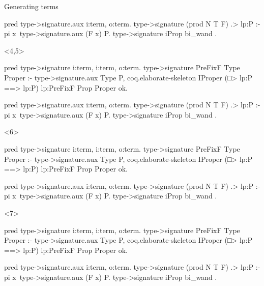 \documentclass[aspectratio=169]{beamer}
\begin{document}
\begin{frame}[fragile]{Generating terms}
\begin{onlyenv}
\begin{elpicode}[highlightlines={3},highlightcolor=DarkSalmon]
            pred type->signature.aux i:term, o:term.
            type->signature (prod N T F) {{ .> lp:P }} :-
                pi x\ type->signature.aux (F x) P.
            type->signature {{ iProp }} {{ bi_wand }}.
        \end{elpicode}
    \end{onlyenv}
    \begin{onlyenv}<4,5>
        \begin{elpicode}[highlightlines={9,10},highlightcolor=DarkSalmon]
            pred type->signature i:term, i:term, o:term.
            type->signature PreFixF Type Proper :-
                type->signature.aux Type P,
                coq.elaborate-skeleton 
                    {{ IProper (□> lp:P ==> lp:P) lp:PreFixF }} 
                    {{ Prop }} Proper ok.
    
            pred type->signature.aux i:term, o:term.
            type->signature (prod N T F) {{ .> lp:P }} :-
                pi x\ type->signature.aux (F x) P.
            type->signature {{ iProp }} {{ bi_wand }}.
        \end{elpicode}
    \end{onlyenv}
    \begin{onlyenv}<6>
        \begin{elpicode}[highlightlines={11},highlightcolor=DarkSalmon]
            pred type->signature i:term, i:term, o:term.
            type->signature PreFixF Type Proper :-
                type->signature.aux Type P,
                coq.elaborate-skeleton 
                    {{ IProper (□> lp:P ==> lp:P) lp:PreFixF }} 
                    {{ Prop }} Proper ok.
    
            pred type->signature.aux i:term, o:term.
            type->signature (prod N T F) {{ .> lp:P }} :-
                pi x\ type->signature.aux (F x) P.
            type->signature {{ iProp }} {{ bi_wand }}.
        \end{elpicode}
    \end{onlyenv}
    \begin{onlyenv}<7>
        \begin{elpicode}[highlightlines={4,5,6},highlightcolor=DarkSalmon]
            pred type->signature i:term, i:term, o:term.
            type->signature PreFixF Type Proper :-
                type->signature.aux Type P,
                coq.elaborate-skeleton 
                    {{ IProper (□> lp:P ==> lp:P) lp:PreFixF }} 
                    {{ Prop }} Proper ok.
    
            pred type->signature.aux i:term, o:term.
            type->signature (prod N T F) {{ .> lp:P }} :-
                pi x\ type->signature.aux (F x) P.
            type->signature {{ iProp }} {{ bi_wand }}.
        \end{elpicode}
    \end{onlyenv}
\end{frame}
\end{document}
